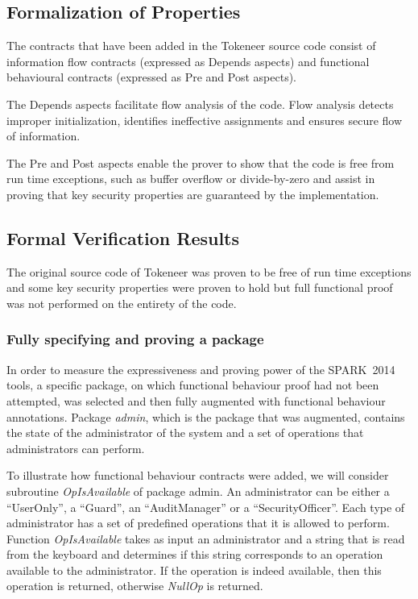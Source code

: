 \documentclass[10pt,a4paper,twocolumn]{article}
\newcommand{\newspark}{SPARK~2014\xspace}
\begin{document}
\subsection{Formalization of Properties}

The contracts that have been added in the Tokeneer source code consist
of information flow contracts (expressed as Depends aspects) and
functional behavioural contracts (expressed as Pre and Post aspects).

The Depends aspects facilitate flow analysis of the code. Flow
analysis detects improper initialization, identifies ineffective
assignments and ensures secure flow of information.

The Pre and Post aspects enable the prover to show that the code is
free from run time exceptions, such as buffer overflow or
divide-by-zero and assist in proving that key security properties are
guaranteed by the implementation.

\subsection{Formal Verification Results}

The original source code of Tokeneer was proven to be free of run time
exceptions and some key security properties were proven to hold but
full functional proof was not performed on the entirety of the code.

\subsubsection{Fully specifying and proving a package}

In order to measure the expressiveness and proving power of the
\newspark tools, a specific package, on which functional behaviour
proof had not been attempted, was selected and then fully augmented
with functional behaviour annotations. Package \emph{admin}, which is
the package that was augmented, contains the state of the
administrator of the system and a set of operations that
administrators can perform.

To illustrate how functional behaviour contracts were added, we will
consider subroutine \emph{OpIsAvailable} of package admin. An
administrator can be either a ``UserOnly'', a ``Guard'', an
``AuditManager'' or a ``SecurityOfficer''. Each type of administrator
has a set of predefined operations that it is allowed to
perform. Function \emph{OpIsAvailable} takes as input an administrator
and a string that is read from the keyboard and determines if this
string corresponds to an operation available to the administrator. If
the operation is indeed available, then this operation is returned,
otherwise \emph{NullOp} is returned.
\end{document}
